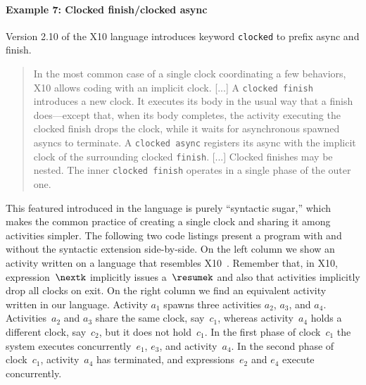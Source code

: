 \paragraph{Example 7: Clocked finish/clocked async}

Version 2.10 of the X10 language introduces keyword \lstinline{clocked} to
prefix async and finish.
\begin{quote}
  In the most common case of a single clock coordinating a few
  behaviors, X10 allows coding with an implicit clock.
[...]
A \lstinline{clocked finish} introduces a new clock.
It executes its body in the usual way that a finish does---except
  that, when its body completes, the activity executing the clocked
  finish drops the clock, while it waits for asynchronous spawned
  asyncs to terminate.
A \lstinline{clocked async} registers its async with the implicit clock
  of the surrounding clocked \lstinline{finish}.
[...]
Clocked finishes may be nested. The inner
  \lstinline{clocked finish} operates in a single phase of the outer one.
\end{quote}

This featured introduced in the language is purely ``syntactic
sugar,'' which makes the common practice of creating a single clock and
sharing it among activities simpler.
The following two code listings present a program with and without the
syntactic extension side-by-side.
On the left column we show an activity written on a language that
resembles X10~\cite{saraswat:x10-report}. Remember that, in X10,
expression~$\nextk$ implicitly issues a~$\resumek$ and also that
activities implicitly drop all clocks on exit.
On the right column we find an equivalent activity written in our language.
Activity $a_1$ spawns three activities $a_2$, $a_3$, and $a_4$.
Activities~$a_2$ and $a_3$ share the same clock, say~$c_1$,
whereas activity~$a_4$ holds a different clock, say~$c_2$, but
it does not hold~$c_1$.
In the first phase of clock~$c_1$ the system executes
concurrently~$e_1$, $e_3$, and activity~$a_4$.
In the second phase of clock~$c_1$, activity~$a_4$ has
terminated, and expressions~$e_2$ and $e_4$ execute concurrently.


